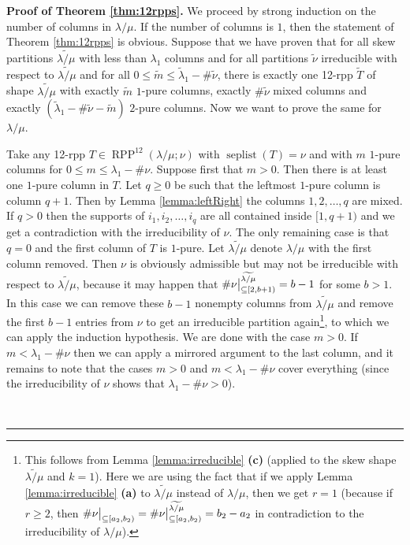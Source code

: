 \documentclass[numbers=enddot,12pt,final,onecolumn,notitlepage]{scrartcl}%
\theoremstyle{definition}
\newenvironment{proof}[1][Proof]{\noindent\textbf{#1.} }{\ \rule{0.5em}{0.5em}}
\def\seplist{{\operatorname{seplist}}} %
\def\seplistvar{{{\nu}}} %
\def\lm{{\lambda/\mu}}
\def\OneTwoRPPCutvar{{\operatorname{RPP}^{12}\left(  \lambda/\mu ;\seplistvar \right)}}
\begin{document}
\begin{proof}[Proof of Theorem \ref{thm:12rpps}]
We proceed by strong induction on the number of columns in $\lm$. If the number of columns is $1$, then the statement of Theorem \ref{thm:12rpps} is obvious. Suppose that we have proven that for all skew partitions $\widetilde{\lm}$ with less than $\lambda_1$ columns and for all partitions $\widetilde\seplistvar$  irreducible with respect to $\widetilde{\lm}$ and for all $0\leq \widetilde m\leq \widetilde{\lambda}_1-\#\widetilde\seplistvar$, there is exactly one 12-rpp $\widetilde T$ of shape $\widetilde{\lm}$ with exactly $\widetilde m$ $1$-pure columns, exactly $\#\widetilde\seplistvar$ mixed columns and exactly $(\widetilde{\lambda}_1-\#\widetilde\seplistvar-\widetilde m)$ $2$-pure columns. Now we want to prove the same for $\lm$.

Take any 12-rpp $T\in\OneTwoRPPCutvar$ with $\seplist(T)=\seplistvar$ and with $m$ $1$-pure columns for $0\leq m\leq \lambda_1-\#\seplistvar$. Suppose first that $m>0$. Then there is at least one $1$-pure column in $T$. Let $q\geq 0$ be such that the leftmost $1$-pure column is column $q+1$. Then by Lemma \ref{lemma:leftRight} the columns $1,2,\dots,q$ are mixed. If $q>0$ then the supports of $i_1,i_2,\dots,i_q$ are all contained inside $[1,q+1)$ and we get a contradiction with the irreducibility of $\seplistvar$. The only remaining case is that $q=0$ and the first column of $T$ is $1$-pure. Let $\widetilde\lm$ denote $\lm$ with the first column removed. Then $\seplistvar$ is obviously admissible but may not be irreducible with respect to $\widetilde{\lm}$, because it may happen that $\#\nuxy{2}{b+1}^{\widetilde{\lm}}=b-1$
for some $b>1$. In this case we can remove these $b-1$ nonempty columns from $\widetilde{\lm}$ and remove the first $b-1$ entries from $\nu$ to get an irreducible partition again\footnote{This follows from Lemma \ref{lemma:irreducible} \textbf{(c)} (applied to the skew shape $\widetilde{\lm}$ and $k=1$). Here we are using the fact that if we apply Lemma \ref{lemma:irreducible} \textbf{(a)} to $\widetilde{\lm}$ instead of $\lm$, then we get $r = 1$ (because if $r \geq 2$, then $\#\nuxy{a_2}{b_2} = \#\nuxy{a_2}{b_2}^{\widetilde{\lm}} = b_2-a_2$ in contradiction to the irreducibility of $\lm$).}, to which we can apply the induction hypothesis. We are done with the case $m>0$. If $m<\lambda_1-\#\seplistvar$ then we can apply a mirrored argument to the last column, and it remains to note that the cases $m>0$ and $m<\lambda_1-\#\seplistvar$ cover everything (since the irreducibility of $\nu$ shows that $\lambda_1-\#\seplistvar>0$).


\end{proof}
\end{document}
